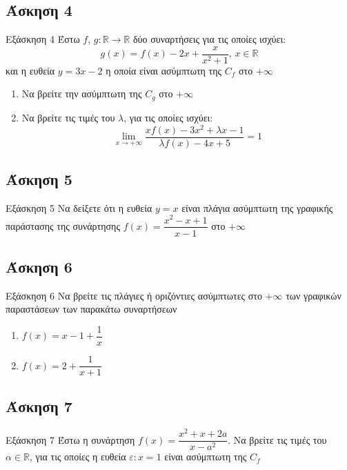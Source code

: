 \documentclass[greek]{beamer}
\begin{document}
\subsection{Άσκηση 4}
\begin{frame}[label=Άσκηση4,t]{Εξάσκηση 4}
    Έστω $f$, $g:\mathbb{R}\to\mathbb{R}$ δύο συναρτήσεις για τις οποίες ισχύει:
    $$g(x)=f(x)-2x+\dfrac{x}{x^2+1} \text{, } x\in\mathbb{R}$$
    και η ευθεία $y=3x-2$ η οποία είναι ασύμπτωτη της $C_f$ στο $+\infty$
    \begin{enumerate}
        \item<1-> Να βρείτε την ασύμπτωτη της $C_g$ στο $+\infty$
        \item<2-> Να βρείτε τις τιμές του $λ$, για τις οποίες ισχύει:
            $$\lim\limits_{x \to +\infty}{ \dfrac{xf(x)-3x^2+λx-1}{λf(x)-4x+5} }=1$$
    \end{enumerate}

\end{frame}

\subsection{Άσκηση 5}
\begin{frame}[label=Άσκηση5,t]{Εξάσκηση 5}
    Να δείξετε ότι η ευθεία $y=x$ είναι πλάγια ασύμπτωτη της γραφικής παράστασης της συνάρτησης $f(x)=\dfrac{x^2-x+1}{x-1}$ στο $+\infty$

\end{frame}

\subsection{Άσκηση 6}
\begin{frame}[label=Άσκηση6,t]{Εξάσκηση 6}
    Να βρείτε τις πλάγιες ή οριζόντιες ασύμπτωτες στο $+\infty$ των γραφικών παραστάσεων των παρακάτω συναρτήσεων
    \begin{enumerate}
        \item<1-> $f(x)=x-1+\dfrac{1}{x}$
        \item<2-> $f(x)=2+\dfrac{1}{x+1}$
    \end{enumerate}

\end{frame}

\subsection{Άσκηση 7}
\begin{frame}[label=Άσκηση7,t]{Εξάσκηση 7}
    Έστω η συνάρτηση $f(x)=\dfrac{x^2+x+2a}{x-a^2}$. Να βρείτε τις τιμές του $α\in\mathbb{R}$, για τις οποίες η ευθεία $ε:x=1$ είναι ασύμπτωτη της $C_f$

\end{frame}
\end{document}
